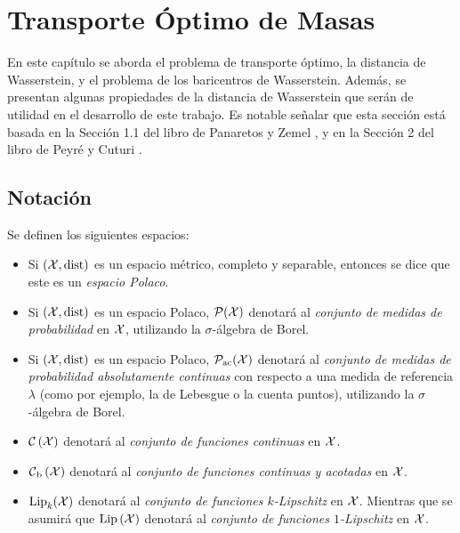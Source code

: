 \chapter{Transporte Óptimo de Masas}\label{chap:transporte-optimo-de-masas}
{

	En este capítulo se aborda el problema de transporte óptimo, la distancia de Wasserstein, y el problema de los baricentros de Wasserstein. Además, se presentan algunas propiedades de la distancia de Wasserstein que serán de utilidad en el desarrollo de este trabajo.
	Es notable señalar que esta sección está basada en la Sección 1.1 del libro de Panaretos y Zemel \cite{panaretos2020invitation}, y en la Sección 2 del libro de Peyré y Cuturi \cite{peyre2019computational}.

	\section*{Notación}\label{sec:notacion}
	{
		\begin{definition}
			Se definen los siguientes espacios:
			\begin{itemize}
				\item Si $(\cX, \dist)$ es un espacio métrico, completo y separable, entonces se dice que este es un \emph{espacio Polaco}.
				\item Si $(\cX, \dist)$ es un espacio Polaco, $\ProbSpace[\cX]$ denotará al \emph{conjunto de medidas de probabilidad} en $\cX$, utilizando la $\sigma$-álgebra de Borel.
				\item Si $(\cX, \dist)$ es un espacio Polaco, $\ProbSpaceAC[\cX]$ denotará al \emph{conjunto de medidas de probabilidad absolutamente continuas} con respecto a una medida de referencia $\lambda$ (como por ejemplo, la de Lebesgue o la cuenta puntos), utilizando la $\sigma$-álgebra de Borel.
				\item $\ContSpace[\cX]$ denotará al \emph{conjunto de funciones continuas} en $\cX$.
				\item $\ContBoundedSpace[\cX]$ denotará al \emph{conjunto de funciones continuas y acotadas} en $\cX$.
				\item ${\Lip}_{k}(\cX)$ denotará al \emph{conjunto de funciones $k$-Lipschitz} en $\cX$. Mientras que se asumirá que $\Lip[\cX]$ denotará al \emph{conjunto de funciones $1$-Lipschitz} en $\cX$. 
			\end{itemize}
		\end{definition}

}}
